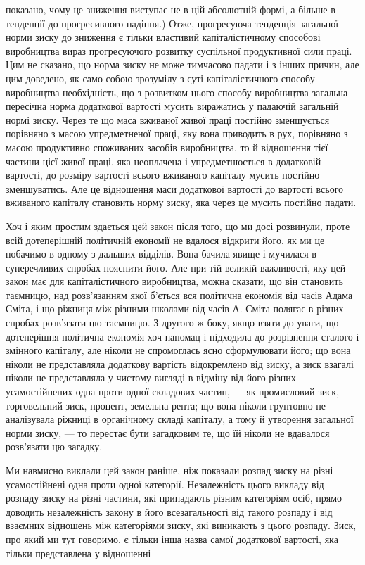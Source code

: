 \parcont{}  %
показано, чому це зниження виступає не в цій абсолютній формі,
а більше в тенденції до прогресивного падіння.) Отже, прогресуюча
тенденція загальної норми зиску до зниження є тільки
властивий капіталістичному способові виробництва вираз
прогресуючого розвитку суспільної продуктивної сили праці.
Цим не сказано, що норма зиску не може тимчасово падати і
з інших причин, але цим доведено, як само собою зрозумілу
з суті капіталістичного способу виробництва необхідність, що
з розвитком цього способу виробництва загальна пересічна норма
додаткової вартості мусить виражатись у падаючій загальній
нормі зиску. Через те що маса вживаної живої праці постійно
зменшується порівняно з масою упредметненої праці, яку вона
приводить в рух, порівняно з масою продуктивно споживаних
засобів виробництва, то й відношення тієї частини цієї живої
праці, яка неоплачена і упредметнюється в додатковій вартості,
до розміру вартості всього вживаного капіталу мусить постійно
зменшуватись. Але це відношення маси додаткової вартості до
вартості всього вживаного капіталу становить норму зиску, яка
через це мусить постійно падати.

Хоч і яким простим здається цей закон після того, що ми досі
розвинули, проте всій дотеперішній політичній економії не вдалося
відкрити його, як ми це побачимо в одному з дальших відділів.
Вона бачила явище і мучилася в суперечливих спробах
пояснити його. Але при тій великій важливості, яку цей закон
має для капіталістичного виробництва, можна сказати, що він
становить таємницю, над розв’язанням якої б’ється вся політична
економія від часів Адама Сміта, і що ріжниця між різними школами
від часів А. Сміта полягає в різних спробах розв’язати цю
таємницю. З другого ж боку, якщо взяти до уваги, що дотеперішня
політична економія хоч напомац і підходила до розрізнення
сталого і змінного капіталу, але ніколи не спромоглась
ясно сформулювати його; що вона ніколи не представляла додаткову
вартість відокремлено від зиску, а зиск взагалі ніколи
не представляла у чистому вигляді в відміну від його різних
усамостійнених одна проти одної складових частин, — як промисловий
зиск, торговельний зиск, процент, земельна рента; що
вона ніколи грунтовно не аналізувала ріжниці в органічному
складі капіталу, а тому й утворення загальної норми зиску, —
то перестає бути загадковим те, що їй ніколи не вдавалося розв’язати
цю загадку.

Ми навмисно виклали цей закон раніше, ніж показали розпад
зиску на різні усамостійнені одна проти одної категорії. Незалежність
цього викладу від розпаду зиску на різні частини,
які припадають різним категоріям осіб, прямо доводить незалежність
закону в його всезагальності від такого розпаду і від
взаємних відношень між категоріями зиску, які виникають з цього
розпаду. Зиск, про який ми тут говоримо, є тільки інша назва
самої додаткової вартості, яка тільки представлена у відношенні
\parbreak{}  %
